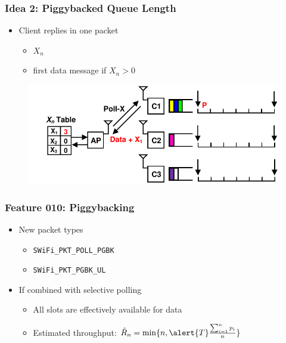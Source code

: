 \documentclass{beamer}
\begin{document}
\begin{frame}
\frametitle{Idea 2: Piggybacked Queue Length}
\begin{itemize}
\item Client replies in one packet
  \begin{itemize}
    \item $X_n$
    \item first data message if $X_n>0$
  \end{itemize}
\end{itemize}
\begin{figure}
\centering
\includegraphics[scale=0.8]{piggyback_1.pdf}
\end{figure}
\end{frame}

\begin{frame}
\frametitle{Feature 010: Piggybacking}
\begin{itemize}
  \item New packet types
    \begin{itemize}
      \item \lstinline|SWiFi_PKT_POLL_PGBK|
      \item \lstinline|SWiFi_PKT_PGBK_UL|
    \end{itemize}
  \item If combined with selective polling
    \begin{itemize}
      \item All slots are effectively available for data
      \item Estimated throughput: $\hat{R}_n = \min\{n, \alert{T}\frac{\sum_{i=1}^{n}p_i}{n} \}$
    \end{itemize}
\end{itemize}
\end{frame}
\end{document}
